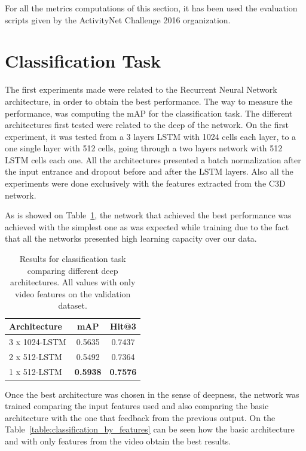 For all the metrics computations of this section, it has been used the evaluation scripts given by the ActivityNet Challenge 2016 organization.

\section{Classification Task}

The first experiments made were related to the Recurrent Neural Network architecture, in order to obtain the best performance. The way to measure the performance, was computing the mAP for the classification task. The different architectures first tested were related to the deep of the network. On the first experiment, it was tested from a 3 layers LSTM with 1024 cells each layer, to a one single layer with 512 cells, going through a two layers network with 512 LSTM cells each one. All the architectures presented a batch normalization after the input entrance and dropout before and after the LSTM layers. Also all the experiments were done exclusively with the features extracted from the C3D network.

As is showed on Table~\ref{table:classification_by_architecture}, the network that achieved the best performance was achieved with the simplest one as was expected while training due to the fact that all the networks presented high learning capacity over our data.

\begin{table}[H]
\begin{center}
\begin{tabular}{|l|c|c|}
\hline
Architecture & mAP & Hit@3 \\
\hline\hline
3 x 1024-LSTM & 0.5635 & 0.7437 \\
2 x 512-LSTM & 0.5492 & 0.7364 \\
1 x 512-LSTM & \bf0.5938 & \bf0.7576 \\
\hline
\end{tabular}
\end{center}
\caption{Results for classification task comparing different deep architectures. All values with
         only video features on the validation dataset.}
\label{table:classification_by_architecture}
\end{table}

Once the best architecture was chosen in the sense of deepness, the network was trained comparing the input features used and also comparing the basic architecture with the one that feedback from the previous output. On the Table~\ref{table:classification_by_features} can be seen how the basic architecture and with only features from the video obtain the best results.

